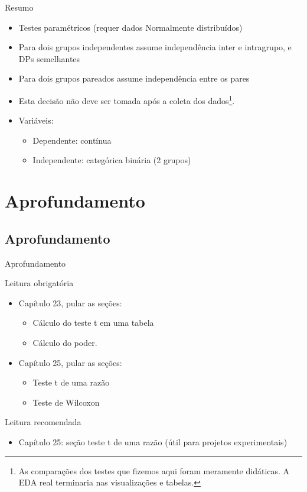 \documentclass{beamer}
\begin{document}
\begin{frame}{\scriptsize Resumo}
  \begin{itemize}
    \footnotesize
  \item Testes paramétricos ({\footnotesize requer dados Normalmente distribuídos})
  \item Para dois grupos independentes assume independência inter e intragrupo, e DPs semelhantes
  \item Para dois grupos pareados assume independência entre os pares
  \item Esta decisão \alert{não deve} ser tomada após a coleta dos dados\footnote{\tiny As comparações dos testes que fizemos aqui foram meramente didáticas. A EDA real terminaria nas visualizações e tabelas.}.
  \item Variáveis:
    \begin{itemize}
      \scriptsize
    \item Dependente: contínua
    \item Independente: categórica binária (2 grupos)
    \end{itemize}
  \end{itemize}
\end{frame}

\section{Aprofundamento}

\subsection{Aprofundamento}

\begin{frame}{\scriptsize Aprofundamento}
  \begin{block}{Leitura obrigatória}
    \begin{itemize}
      \footnotesize
    \item Capítulo 23, pular as seções:
      \begin{itemize}
        \scriptsize
      \item Cálculo do teste t em uma tabela
      \item Cálculo do poder.
      \end{itemize}
    \item Capítulo 25, pular as seções:
      \begin{itemize}
        \scriptsize
      \item Teste t de uma razão
      \item Teste de Wilcoxon
      \end{itemize}
    \end{itemize}
  \end{block}
  \begin{block}{Leitura recomendada}
    \begin{itemize}
      \scriptsize
    \item Capítulo 25: seção teste t de uma razão ({\tiny útil para projetos experimentais})
      \end{itemize}
  \end{block}
\end{frame}
\end{document}
